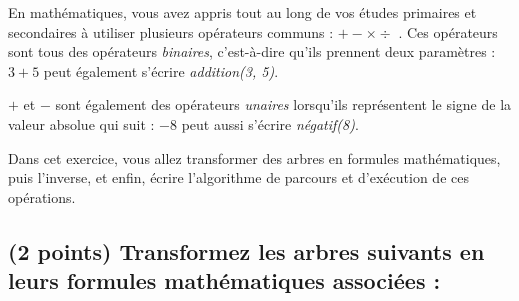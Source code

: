 \documentclass[11pt,a4paper]{article}
\begin{document}
\noindent En mathématiques, vous avez appris tout au long de vos études primaires et secondaires à utiliser plusieurs opérateurs communs : \og $ + - \times \div $ \fg{}.
Ces opérateurs sont tous des opérateurs \textit{binaires}, c'est-à-dire qu'ils prennent deux paramètres : \og $ 3 + 5 $ \fg{} peut également s'écrire \textit{addition(3, 5)}.

\noindent \og $ + $ \fg{} et \og $ - $ \fg{} sont également des opérateurs \textit{unaires} lorsqu'ils représentent le signe de la valeur absolue qui suit : \og $ - 8 $ \fg{} peut aussi s'écrire \textit{négatif(8)}.

\medskip

\noindent Dans cet exercice, vous allez transformer des arbres en formules mathématiques, puis l'inverse, et enfin, écrire l'algorithme de parcours et d'exécution de ces opérations.


\subsection{(2 points) Transformez les arbres suivants en leurs formules mathématiques associées : }
\end{document}
